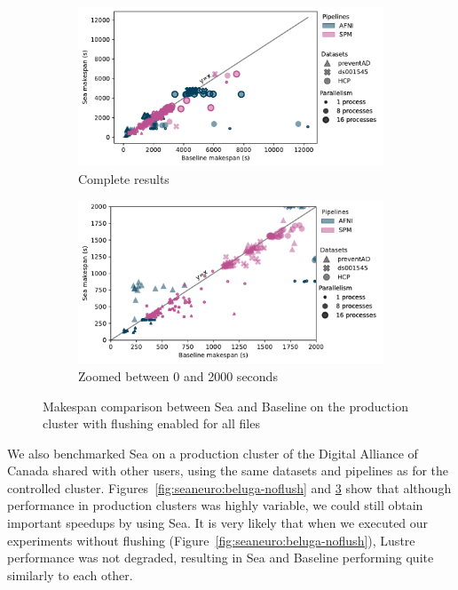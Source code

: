 \documentclass[fleqn,10pt]{wlscirep}
\begin{document}
\begin{figure}
\begin{subfigure}{0.5\textwidth}
    \centering
    \captionsetup{width=.85\linewidth}
    \includegraphics[width=\columnwidth]{figures/beluga_withflush_nozoom.pdf}%
    \caption{Complete results}\label{fig:seaneuro:belugafullwf}
\end{subfigure}
\begin{subfigure}{0.5\textwidth}
    \centering
    \captionsetup{width=.85\linewidth}
    \includegraphics[width=\linewidth]{figures/beluga_withflush_zoom.pdf}
    \caption{Zoomed between 0 and 2000 seconds}\label{fig:seaneuro:belugazoomwf}
\end{subfigure}
\caption{Makespan comparison between Sea and Baseline on the production cluster with flushing enabled for all files}
\label{fig:seaneuro:beluga-wflush}
\end{figure}

  We also benchmarked Sea on a production cluster of the Digital Alliance of Canada
  shared with other users,
  using the same datasets and pipelines as for the controlled cluster. 
  Figures~\ref{fig:seaneuro:beluga-noflush} and \ref{fig:seaneuro:beluga-wflush}
  show that although performance in production clusters was highly variable,
  we could still obtain important speedups by using Sea. It is very likely that when we
  executed our experiments without flushing
  (Figure~\ref{fig:seaneuro:beluga-noflush}), Lustre performance was not degraded, 
  resulting in Sea and Baseline performing
  quite similarly to each other.
  
\end{document}
